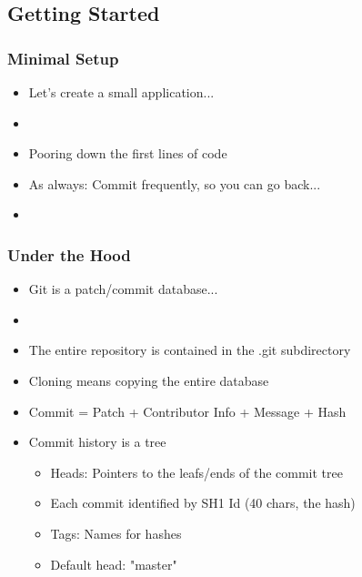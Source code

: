 %
%
%
%

\subsection{Getting Started}

\begin{slide}[fragile]
  \frametitle{Minimal Setup}
  \begin{itemize}
    \item Let's create a small application...
    \item[]
    \item Pooring down the first lines of code
    \item As always: Commit frequently, so you can go back...
    \item[]
  \end{itemize}
\end{slide}

\begin{slide}[fragile]
  \frametitle{Under the Hood}
  \begin{itemize}
    \item Git is a patch/commit database...
    \item[]
    \item The entire repository is contained in the .git subdirectory
    \item Cloning means copying the entire database
    \item Commit = Patch + Contributor Info + Message + Hash
    \item Commit history is a tree
    \begin{itemize}
      \item Heads: Pointers to the leafs/ends of the commit tree
      \item Each commit identified by SH1 Id (40 chars, the hash)
      \item Tags: Names for hashes
      \item Default head: "master"
    \end{itemize}
  \end{itemize}
\end{slide}

